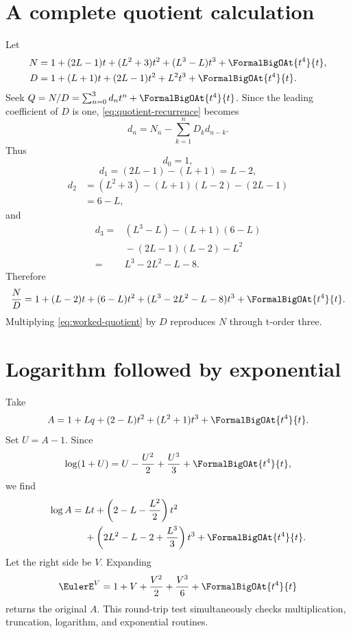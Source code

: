 \documentclass[11pt,openany]{book}
\theoremstyle{definition}
\theoremstyle{plain}
\theoremstyle{remark}
\begin{document}
\section{A complete quotient calculation}
Let
\begin{align*}
 N={}&1+(2L-1)t+(L^2+3)t^2+(L^3-L)t^3+\FormalBigOAt{t^4}{t},\\
 D={}&1+(L+1)t+(2L-1)t^2+L^2t^3+\FormalBigOAt{t^4}{t}.
\end{align*}
Seek \(Q=N/D=\sum_{n=0}^3d_nt^n+\FormalBigOAt{t^4}{t}\).  Since the leading coefficient of
\(D\) is one, \cref{eq:quotient-recurrence} becomes
\[
 d_n=N_n-\sum_{k=1}^nD_kd_{n-k}.
\]
Thus
\[
 d_0=1,
\]
\[
 d_1=(2L-1)-(L+1)=L-2,
\]
\begin{align*}
 d_2&=(L^2+3)-(L+1)(L-2)-(2L-1)\\
 &=6-L,
\end{align*}
and
\begin{align*}
 d_3={}&(L^3-L)-(L+1)(6-L)\\
 &{}-(2L-1)(L-2)-L^2\\
={}&L^3-2L^2-L-8.
\end{align*}
Therefore
\begin{equation}\label{eq:worked-quotient}
 \frac ND=1+(L-2)t+(6-L)t^2
 +(L^3-2L^2-L-8)t^3+\FormalBigOAt{t^4}{t}.
\end{equation}
Multiplying \cref{eq:worked-quotient} by \(D\) reproduces \(N\) through
t-order three.

\section{Logarithm followed by exponential}
Take
\[
 A=1+Lq+(2-L)t^2+(L^2+1)t^3+\FormalBigOAt{t^4}{t}.
\]
Set \(U=A-1\).  Since
\[
 \log(1+U)=U-\frac{U^2}{2}+\frac{U^3}{3}+\FormalBigOAt{t^4}{t},
\]
we find
\begin{equation}\label{eq:worked-log}
\begin{split}
 \log A={}&Lt+
 \left(2-L-\frac{L^2}{2}\right)t^2\\
 &+\left(2L^2-L-2+\frac{L^3}{3}\right)t^3
 +\FormalBigOAt{t^4}{t}.
\end{split}
\end{equation}
Let the right side be \(V\).  Expanding
\[
 \EulerE^V=1+V+\frac{V^2}{2}+\frac{V^3}{6}+\FormalBigOAt{t^4}{t}
\]
returns the original \(A\).  This round-trip test simultaneously checks
multiplication, truncation, logarithm, and exponential routines.
\end{document}
